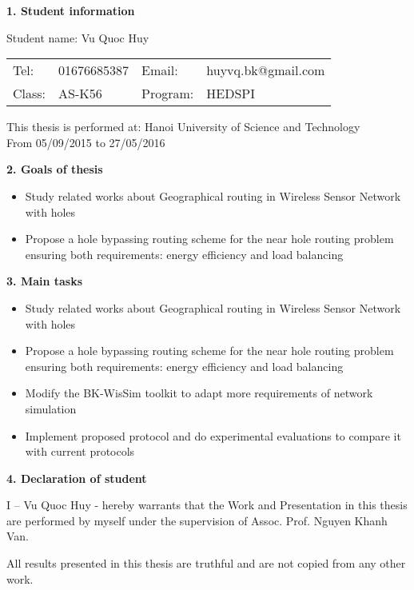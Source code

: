 \begin{acknowledgementslong}      
\textbf{1. Student information}

Student name: Vu Quoc Huy

\begin{tabular}{@{}l l l l}
Tel: & 01676685387 & Email: & huyvq.bk@gmail.com \\ 
Class: & AS-K56 & Program:  & HEDSPI
\end{tabular}

This thesis is performed at: Hanoi University of Science and Technology \\
From 05/09/2015 to 27/05/2016

\textbf{2. Goals of thesis}

\begin{itemize}
\item Study related works about Geographical routing in Wireless Sensor Network with holes
\item Propose a hole bypassing routing scheme for the near hole routing problem ensuring both requirements: energy efficiency and load balancing
\end{itemize}

\textbf{3. Main tasks}
\begin{itemize}
\item Study related works about Geographical routing in Wireless Sensor Network with holes
\item Propose a hole bypassing routing scheme for the near hole routing problem ensuring both requirements: energy efficiency and load balancing
\item Modify the BK-WisSim toolkit to adapt more requirements of network simulation
\item Implement proposed protocol and do experimental evaluations to compare it with current protocols
\end{itemize}


\textbf{4. Declaration of student}

I – Vu Quoc Huy - hereby warrants that the Work and Presentation in this thesis are performed by myself under the supervision of Assoc. Prof. Nguyen Khanh Van.

All results presented in this thesis are truthful and are not copied from any other work.


\end{acknowledgementslong}
